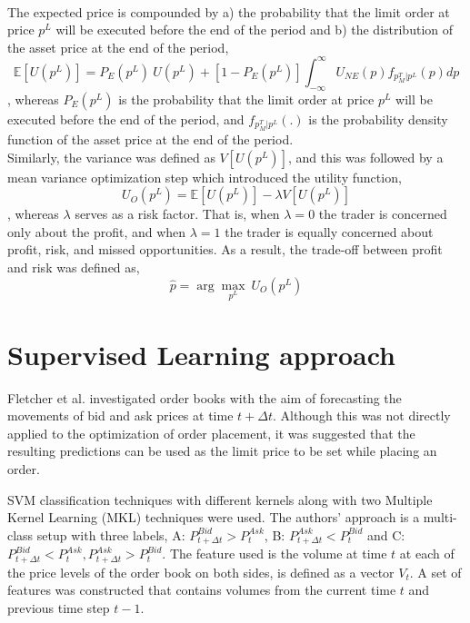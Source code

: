 \hfill
\\
The expected price is compounded by a) the probability that the limit order at price $p^L$ will be executed before the end of the period and b) the distribution of the asset price at the end of the period,
\begin{equation}
    \mathbb{E}[U(p^L)] = P_E(p^L)\ U(p^L) + [1-P_E(p^L)] \int_{-\infty}^{\infty} U_{NE}(p) f_{p_M^T | p^L}(p) dp
\end{equation}
, whereas $P_E(p^L)$ is the probability that the limit order at price $p^L$ will be executed before the end of the period, and $f_{p_M^T | p^L}(.)$ is the probability density function of the asset price at the end of the period. 
\\
Similarly, the variance was defined as $V[U(p^L)]$, and this was followed by a mean variance optimization step which introduced the utility function,
\begin{equation}
    U_O(p^L) = \mathbb{E}[U(p^L)] - \lambda V[U(p^L)]
\end{equation}
, whereas $\lambda$ serves as a risk factor.
That is, when $\lambda=0$ the trader is concerned only about the profit, and when $\lambda=1$ the trader is equally concerned about profit, risk, and missed opportunities.
As a result, the trade-off between profit and risk was defined as,
\begin{equation}
    \hat{p} = \arg\max_{p^L}\ U_O(p^L)
\end{equation}


\section{Supervised Learning approach}
\label{sec:related-supervised}

Fletcher et al. \cite{fletcher2010multiple} investigated order books with the aim of forecasting the movements of bid and ask prices at time $t+\Delta{t}$.
Although this was not directly applied to the optimization of order placement, it was suggested that the resulting predictions can be used as the limit price to be set while placing an order.

SVM classification techniques with different kernels along with two Multiple Kernel Learning (MKL) techniques were used.
The authors' approach is a multi-class setup with three labels, A: $P_{t+\Delta{t}}^{Bid} > P_t^{Ask}$, B: $P_{t+\Delta{t}}^{Ask} < P_t^{Bid}$ and C: $P_{t+\Delta{t}}^{Bid} < P_t^{Ask}, P_{t+\Delta{t}}^{Ask} > P_t^{Bid}$.
The feature used is the volume at time $t$ at each of the price levels of the order book on both sides, is defined as a vector $V_t$.
A set of features was constructed that contains volumes from the current time $t$ and previous time step $t-1$.

